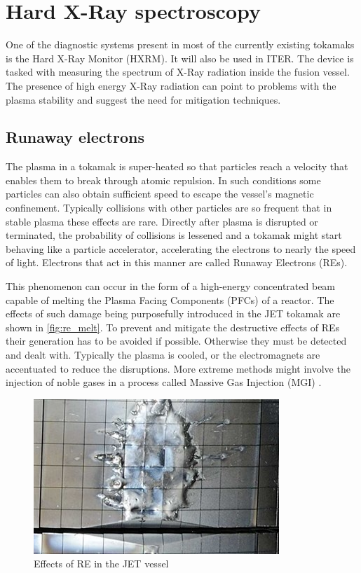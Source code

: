 \section{Hard X-Ray spectroscopy}

One of the diagnostic systems present in most of the currently existing tokamaks
is the Hard X-Ray Monitor (HXRM). It will also be used in ITER.
The device is tasked with measuring the spectrum of X-Ray radiation
inside the fusion vessel. The presence of high energy X-Ray
radiation can point to problems with the plasma stability and suggest the 
need for mitigation techniques.
\cite{low_noise_amplifier_for_pmt}

\subsection{Runaway electrons}

The plasma in a tokamak is super-heated so that particles reach a velocity
that enables them to break through atomic repulsion. In such conditions some 
particles can also obtain sufficient speed to escape the vessel's magnetic confinement.
Typically collisions with other particles are so frequent
that in stable plasma these effects are rare.
Directly after plasma is disrupted or terminated, 
the probability of collisions is lessened 
and a tokamak might start behaving like a particle accelerator,
accelerating the electrons to nearly the speed of light.
Electrons that act in this manner are called Runaway Electrons (REs).
\cite{iter_re_melt}

This phenomenon can occur in the form of a high-energy 
concentrated beam capable of melting the Plasma Facing Components (PFCs) of a reactor.
The effects of such damage being purposefully introduced in the JET tokamak
are shown in \autoref{fig:re_melt}. To prevent and mitigate the destructive
effects of REs their generation has to be avoided if possible. Otherwise
they must be detected and dealt with. Typically the plasma 
is cooled, or the electromagnets are accentuated
to reduce the disruptions. More extreme methods might 
involve the injection of noble gases in a process called 
Massive Gas Injection (MGI) \cite{massive_gas_injection}.
\begin{figure}[H]
  \centering
  \includegraphics[width=.7\linewidth]{media/re_melt.jpeg}
  \caption{Effects of RE in the JET vessel \cite{iter_re_melt}}
  \label{fig:re_melt}
\end{figure}


